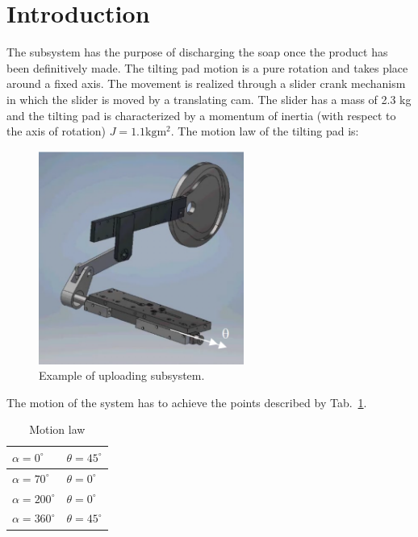 \documentclass[12pt]{scrartcl}
\begin{document}


\tableofcontents
\listoffigures
\listoftables
\newpage
\linespread{1.3}

\section{Introduction}
The subsystem has the purpose of discharging the soap once the product has been definitively made. The tilting pad motion is a pure rotation and takes place around a fixed axis. The movement is realized through a slider crank mechanism in which the slider is moved by a translating cam.
The slider has a mass of 2.3 \si{\kilo\gram} and the tilting pad is characterized by a momentum of inertia (with respect to the axis of rotation) $J =1.1 \si{\kilo\gram\metre\squared}$.
The motion law of the tilting pad is:
\begin{figure}[htbp!]
	\centering
	\includegraphics[width=0.6\textwidth]{Pictures/initial}
	\caption{Example of uploading subsystem.}
	\label{fig: initial system}
\end{figure}

The motion of the system has to achieve the points described by Tab.~\ref{tab: motion law}.
\begin{table}[htbp]
\centering
\begin{tabular}{|l|l|}
\hline
$\alpha = 0^\circ$  & $\theta = 45^\circ$ \\ \hline
$\alpha = 70^\circ$ &  $\theta = 0^\circ$ \\ \hline
  $\alpha = 200^\circ$  & $\theta = 0^\circ$  \\\hline
   $\alpha = 360^\circ$   &  $\theta = 45^\circ$ \\\hline
 \end{tabular}
\caption{Motion law}
\label{tab: motion law}
\end{table}
\end{document}
